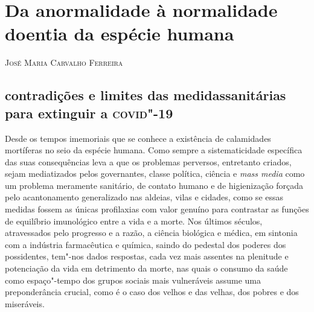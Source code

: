 \chapter[Da anormalidade à normalidade doentia da espécie humana, \emph{por José Maria Carvalho Ferreira}]{Da anormalidade à normalidade\\ doentia da espécie humana}

\begin{flushright}
\textsc{José Maria Carvalho Ferreira}
\end{flushright}

\section{contradições e limites das medidas\break sanitárias para extinguir a \textsc{covid}"-19}

\noindent{}Desde os tempos imemoriais que se conhece a existência de calamidades
mortíferas no seio da espécie humana. Como sempre a sistematicidade
específica das suas consequências leva a que os problemas perversos,
entretanto criados, sejam mediatizados pelos governantes, classe
política, ciência e \emph{mass media} como um problema meramente
sanitário, de contato humano e de higienização forçada pelo
acantonamento generalizado nas aldeias, vilas e cidades, como se essas
medidas fossem as únicas profilaxias com valor genuíno para contrastar
as funções de equilíbrio imunológico entre a vida e a morte. Nos últimos
séculos, atravessados pelo progresso e a razão, a ciência biológica e
médica, em sintonia com a indústria farmacêutica e química, saindo do
pedestal dos poderes dos possidentes, tem"-nos dados respostas, cada vez
mais assentes na plenitude e potenciação da vida em detrimento da morte,
nas quais o consumo da saúde como espaço"-tempo dos grupos sociais mais
vulneráveis assume uma preponderância crucial, como é o caso dos velhos
e das velhas, dos pobres e dos miseráveis.

